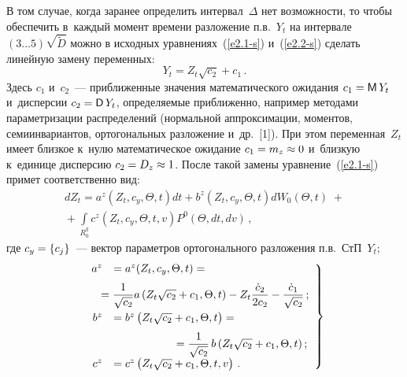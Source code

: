 \begin{multicols}{2}
В том случае, когда заранее определить интервал~$\Delta$ нет возможности, то  
чтобы обеспечить в~каж\-дый момент времени разложение п.в.~$Y_t$ на интервале $(3\ldots5) 
\sqrt{\tilde D}$ можно в исходных уравнениях~(\ref{e2.1-s}) и~(\ref{e2.2-s}) 
сделать линейную замену переменных:
\begin{equation*}
Y_t = Z_t \sqrt{c_2} + c_1\,.
\end{equation*}
Здесь $c_1$ и~$c_2$~--- приближенные значения математического ожидания  
$c_1={\sf M}\, Y_t$ и~дисперсии  $c_2 \hm={\sf D}\, Y_t$, 
определяемые приближенно, например\linebreak
 методами параметризации распределений 
(нормальной аппроксимации, моментов, семиинвариантов, ортогональных разложение 
и~др.~[1]). При этом переменная~$Z_t$ имеет близкое к~нулю математическое ожидание 
$c_1\hm=m_z\hm\approx 0$ и~близкую к~единице дисперсию $c_2 \hm=D_z\hm\approx 1$. 
После такой замены уравнение~(\ref{e2.1-s}) 
примет соответственно вид:
\begin{multline}
   \!\! \!\!dZ_t = a^z \left(Z_t,c_y,\Theta, t\right) dt + 
    b^z \left(Z_t, c_y, \Theta, t\right) d W_0 (\Theta, t)\;+{}\\
    {}+
    \int\limits_{R_0^q} c^z\left(Z_t, c_y, \Theta, t, v\right) 
    P^0 (\Theta, dt, dv)\,,\label{e4.2-s}
    \end{multline}
где $c_y \hm= \{c_j\}$~--- вектор параметров ортогонального разложения п.в.\
 СтП~$Y_t$;
 \begin{equation}
 \left.
 \begin{array}{rl}
    a^z &= a^z( Z_t, c_y, \Theta, t) = {}\\[6pt]
    &\hspace*{-5mm}{}=
    \fr{1}{\sqrt{c_2}} a \left( Z_t \sqrt{c_2} + c_1 ,\Theta, t\right) - 
    Z_t \fr{\dot c_2}{2 c_2} - \fr{\dot c_1}{\sqrt{c_2}}\,;
\\[9pt]
    b^z &= b^z\left( Z_t\sqrt{c_2}+c_1,  \Theta, t\right) ={}\\[6pt]
    &\hspace*{19mm}{}= 
\fr{1}{\sqrt{c_2}}\, b \left( Z_t \sqrt{c_2} + c_1 ,\Theta, t\right);
    \\[6pt]
    c^z&= c^z\left( Z_t \sqrt{c_2}+ c_1, \Theta, t, v\right)\,. 
    \end{array}
    \right\}
    \label{e4.3-s}
   \end{equation}
   
   

\end{multicols}
